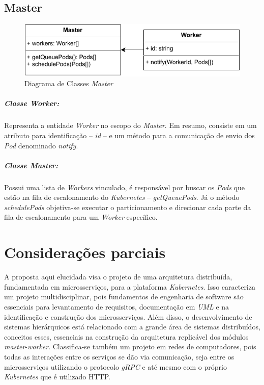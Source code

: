 \documentclass[
	12pt,				%
	openright,			%
	oneside,			%
	a4paper,			%
	brazil				%
	]{abntex2}
\begin{document}
\subsection{Master}
\begin{figure}[h!]
	\caption{\label{fig:master_class_diagram}Diagrama de Classes \textit{Master}}
	\centering
	\includegraphics[width=0.65\linewidth]{assets/master-class-diagram.pdf}
\end{figure}

\subparagraph{Classe \textit{Worker}:}
Representa a entidade \textit{Worker} no escopo do \textit{Master}. Em resumo, consiste em um atributo para identificação -- \textit{id} -- e um método para a comunicação de envio dos \textit{Pod} denominado \textit{notify}.

\subparagraph{Classe \textit{Master}:}
Possui uma lista de \textit{Workers} vinculado, é responsável por buscar os \textit{Pods} que estão na fila de escalonamento do \textit{Kubernetes} -- \textit{getQueuePods}. Já o método \textit{schedulePods} objetiva-se executar o particionamento e direcionar cada parte da fila de escalonamento para um \textit{Worker} específico.

\section{Considerações parciais}
A proposta aqui elucidada visa o projeto de uma arquitetura distribuída, fundamentada em microsserviços, para a plataforma \textit{Kubernetes}. Isso caracteriza um projeto multidisciplinar, pois fundamentos de engenharia de software são essenciais para levantamento de requisitos, documentação em \textit{UML} e na identificação e construção dos microsserviços. Além disso, o desenvolvimento de sistemas hierárquicos está relacionado com a grande área de sistemas distribuídos, conceitos esses, essenciais na construção da arquitetura replicável dos módulos \textit{master}-\textit{worker}. Classifica-se também um projeto em redes de computadores, pois todas as interações entre os serviços se dão via comunicação, seja entre os microsserviços utilizando o protocolo \textit{gRPC} e até mesmo com o próprio \textit{Kubernetes} que é utilizado \ac{HTTP}.
\end{document}
